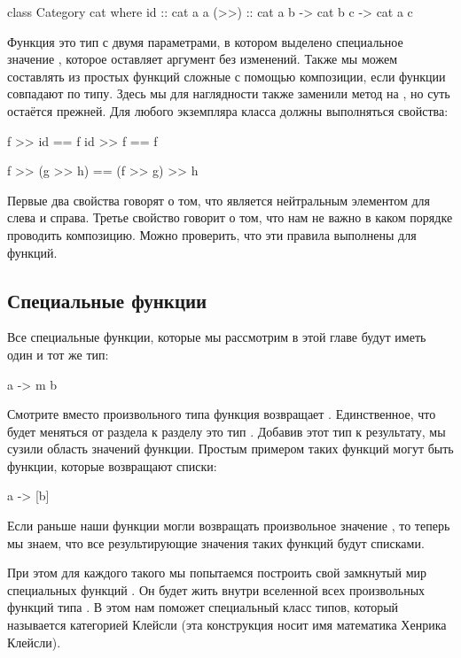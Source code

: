 \begin{code}
class Category cat where
    id   :: cat a a
    (>>) :: cat a b -> cat b c -> cat a c
\end{code}

Функция  это тип с двумя параметрами, в котором выделено
специальное значение , которое оставляет аргумент без изменений.
Также мы можем составлять из простых функций сложные с помощью
композиции, если функции совпадают по типу. Здесь мы для наглядности
также заменили метод  на \In{(>>)}, но суть остаётся прежней.
Для любого экземпляра класса должны выполняться свойства:


\begin{code}
f  >> id  == f
id >> f   == f

f >> (g >> h) == (f >> g) >> h
\end{code}

Первые два свойства говорят о том, что  является нейтральным
элементом для \In{(>>)} слева и справа. Третье свойство говорит о том,
что нам не важно в каком порядке проводить композицию. Можно проверить,
что эти правила выполнены для функций.

\subsection{Специальные функции}

Все специальные функции, которые мы рассмотрим в этой главе будут иметь
один и тот же тип:


\begin{code}
a -> m b
\end{code}

Смотрите вместо произвольного типа  функция возвращает .
Единственное, что будет меняться от раздела к разделу это тип .
Добавив этот тип к результату, мы сузили область значений функции.
Простым примером таких функций могут быть функции, которые возвращают
списки:


\begin{code}
a -> [b]
\end{code}

Если раньше наши функции могли возвращать произвольное значение ,
то теперь мы знаем, что все результирующие значения таких функций будут
списками.

При этом для каждого такого  мы попытаемся построить свой
замкнутый мир специальных функций . Он будет жить внутри
вселенной всех произвольных функций типа . В этом нам поможет
специальный класс типов, который называется категорией Клейсли (эта
конструкция носит имя математика Хенрика Клейсли).


